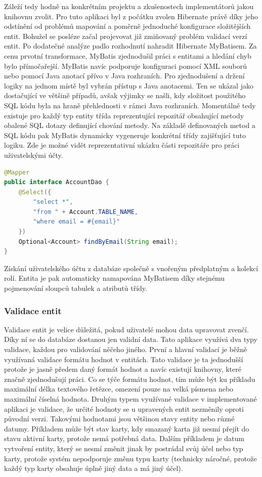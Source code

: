 		Záleží tedy hodně na konkrétním projektu a zkušenostech implementátorů jakou knihovnu zvolit.
		Pro tuto aplikaci byl z počátku zvolen Hibernate právě díky jeho odstínění od problémů mapování a poměrně
		jednoduché konfigurace složitějších entit.
		Bohužel se posléze začal projevovat již zmiňovaný problém validací verzí entit.
		Po dodatečné analýze padlo rozhodnutí nahradit Hibernate MyBatisem.
		Za cenu prvotní transformace, MyBatis zjednodušil práci s entitami a hledání chyb bylo přímočařejší.
		MyBatis navíc podporuje konfiguraci pomocí \ac{XML} souborů nebo pomocí Java anotací přívo v Java rozhraních.
		Pro zjednodušení a držení logiky na jednom místě byl vybrán přístup s Java anotacemi.
		Ten se ukázal jako dostačující ve většině případů, avšak výjimky se našli, kdy složitost použitého \ac{SQL} kódu
		byla na hraně přehlednosti v rámci Java rozhraních.
		Momentálně tedy existuje pro každý typ entity třída reprezentující repozitář obsahující metody obalené \ac{SQL}
		dotazy definující chování metody.
		Na základě definovaných metod a \ac{SQL} kódu pak MyBatis dynamicky vygeneruje konkrétní třídy zajišťující tuto
		logiku.
		Zde je možné vidět reprezentativní ukázku části repozitáře pro práci uživatelskými účty.

		\begin{lstlisting}[language=Java]
@Mapper
public interface AccountDao {
	@Select({
		"select *",
		"from " + Account.TABLE_NAME,
		"where email = #{email}"
	})
	Optional<Account> findByEmail(String email);
}
		\end{lstlisting}

 		Získání uživatelského účtu z databáze společně s vnořeným předplatným a kolekcí rolí.
		Entita je pak automaticky namapována MyBatisem díky stejnému pojmenování sloupců tabulek a atributů třídy.

		\subsubsection{Validace entit}

		Validace entit je velice důležitá, pokud uživatelé mohou data upravovat zvenčí.
		Díky ní se do databáze dostanou jen validní data.
		Tato aplikace využívá dva typy validace, každou pro validování něčeho jiného.
		První a hlavní validací je běžně využívaná validace formátu hodnot v entitách.
		Tato validace je ta jednodušší protože je jasně předem daný formát hodnot a navíc existují knihovny, které
		značně zjednodušují práci.
		Co se týče formátu hodnot, tím může být ku příkladu maximální délka textového řetězce, omezení pouze na velká
		písmena nebo maximální číselná hodnota.
		Druhým typem využívané validace v implementované aplikaci je validace, že určité hodnoty se u upravených entit
		nezměnily oproti původní verzi.
		Takovými hodnotami jsou většinou stavy entity nebo různé datumy.
		Příkladem může být stav karty, kdy smazaný karta již nesmí přejít do stavu aktivní karty, protože nemá potřebná data.
		Dalším příkladem je datum vytvoření entity, který se nesmí změnit jinak by postrádal svůj účel nebo typ karty,
		protože systém nepodporuje změnu typu karty (technicky náročné, protože každý typ karty obsahuje úplně jiný data
		a má jiný účel).


